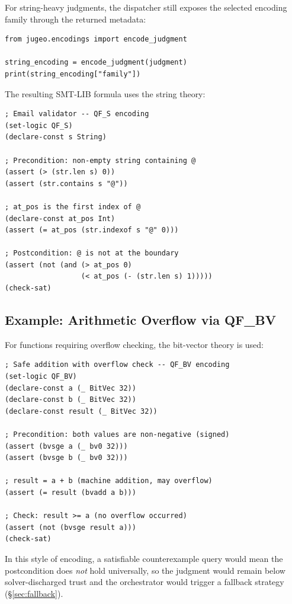 \documentclass[11pt]{article}
\begin{document}
For string-heavy judgments, the dispatcher still exposes the selected
encoding family through the returned metadata:

\begin{lstlisting}[style=jugeo-python]
from jugeo.encodings import encode_judgment

string_encoding = encode_judgment(judgment)
print(string_encoding["family"])
\end{lstlisting}

The resulting SMT-LIB formula uses the string theory:

\begin{lstlisting}[style=jugeo-output]
; Email validator -- QF_S encoding
(set-logic QF_S)
(declare-const s String)

; Precondition: non-empty string containing @
(assert (> (str.len s) 0))
(assert (str.contains s "@"))

; at_pos is the first index of @
(declare-const at_pos Int)
(assert (= at_pos (str.indexof s "@" 0)))

; Postcondition: @ is not at the boundary
(assert (not (and (> at_pos 0)
                  (< at_pos (- (str.len s) 1)))))
(check-sat)
\end{lstlisting}

\subsection{Example: Arithmetic Overflow via QF\_BV}

For functions requiring overflow checking, the bit-vector theory is used:

\begin{lstlisting}[style=jugeo-output]
; Safe addition with overflow check -- QF_BV encoding
(set-logic QF_BV)
(declare-const a (_ BitVec 32))
(declare-const b (_ BitVec 32))
(declare-const result (_ BitVec 32))

; Precondition: both values are non-negative (signed)
(assert (bvsge a (_ bv0 32)))
(assert (bvsge b (_ bv0 32)))

; result = a + b (machine addition, may overflow)
(assert (= result (bvadd a b)))

; Check: result >= a (no overflow occurred)
(assert (not (bvsge result a)))
(check-sat)
\end{lstlisting}

In this style of encoding, a satisfiable counterexample query would mean
the postcondition does \emph{not} hold universally, so the judgment would
remain below solver-discharged trust and the orchestrator would trigger a
fallback strategy (\S\ref{sec:fallback}).
\end{document}
